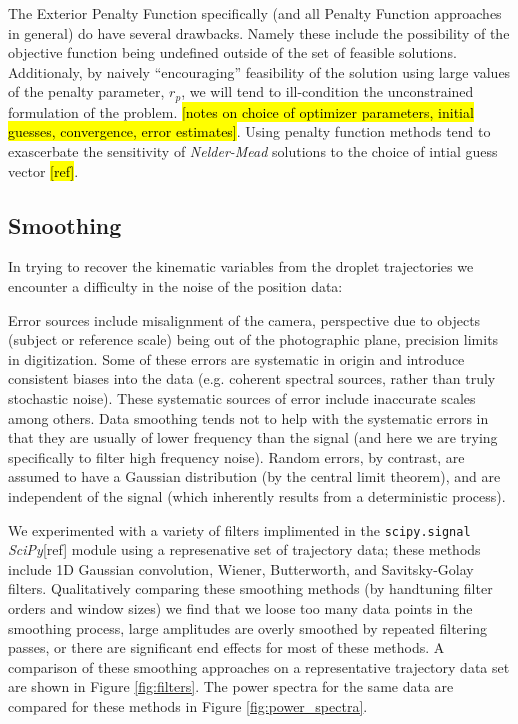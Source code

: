 \documentclass[10pt,a4paper]{article}
\begin{document}
The Exterior Penalty Function specifically (and all Penalty Function approaches in general) do have several drawbacks. Namely these include the possibility of the objective function being undefined outside of the set of feasible solutions. Additionaly, by naively ``encouraging'' feasibility of the solution using large values of the penalty parameter, $r_p$, we will tend to ill-condition the unconstrained formulation of the problem.
\hl{[notes on choice of optimizer parameters, initial guesses, convergence, error estimates]}. Using penalty function methods tend to exascerbate the sensitivity of \emph{Nelder-Mead} solutions to the choice of intial guess vector \hl{[ref]}. 

\subsection{Smoothing}
In trying to recover the kinematic variables from the droplet trajectories we encounter a difficulty in the noise of the position data:

Error sources include misalignment of the camera, perspective due to objects (subject or reference scale) being out of the photographic plane, precision limits in digitization. Some of these errors are systematic in origin and introduce consistent biases into the data (e.g. coherent spectral sources, rather than truly stochastic noise). These systematic sources of error include inaccurate scales among others. Data smoothing tends not to help with the systematic errors in that they are usually of lower frequency than the signal (and here we are trying specifically to filter high frequency noise). Random errors, by contrast, are assumed to have a Gaussian distribution (by the central limit theorem), and are independent of the signal (which inherently results from a deterministic process).

We experimented with a variety of filters implimented in the \verb|scipy.signal| \emph{SciPy}[ref] module using a represenative set of trajectory data; these methods include 1D Gaussian convolution, Wiener, Butterworth, and Savitsky-Golay filters. Qualitatively comparing these smoothing methods (by handtuning filter orders and window sizes) we find that we loose too many data points in the smoothing process, large amplitudes are overly smoothed by repeated filtering passes, or there are significant end effects for most of these methods. A comparison of these smoothing approaches on a representative trajectory data set are shown in Figure \ref{fig:filters}. The power spectra for the same data are compared for these methods in Figure \ref{fig:power_spectra}.
\end{document}
